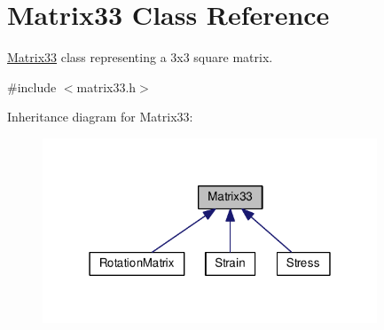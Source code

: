 \hypertarget{classMatrix33}{\section{Matrix33 Class Reference}
\label{de/d82/classMatrix33}
}


\hyperlink{classMatrix33}{Matrix33} class representing a 3x3 square matrix.  




{\ttfamily \#include $<$matrix33.\-h$>$}



Inheritance diagram for Matrix33\-:\nopagebreak
\begin{figure}[H]
\begin{center}
\leavevmode
\includegraphics[width=283pt]{dc/dfe/classMatrix33__inherit__graph}
\end{center}
\end{figure}
